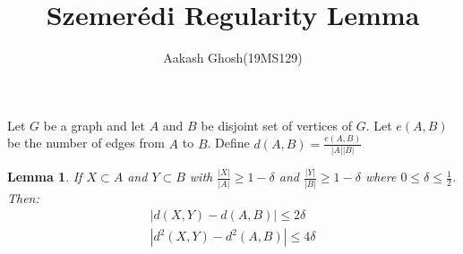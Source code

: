 \documentclass{tufte-handout}
\title{\Huge{Szemerédi Regularity Lemma}}
\author[Aaksh Ghosh]{Aakash Ghosh(19MS129)}
\newtheorem{lemma}[theorem]{Lemma}
\begin{document}
\maketitle%

\begin{abstract}
\noindent
\end{abstract}

\noindent Let $G$ be a graph and let $A$ and $B$ be disjoint set of vertices of $G$. Let $e(A,B)$ be the number of edges from $A$ to $B$. Define $d(A,B)=\frac{e(A,B)}{|A||B|}$  

\begin{lemma}
  If $X\subset A$ and $Y\subset B$ with $\frac{|X|}{|A|}\geq 1-\delta$ and $\frac{|Y|}{|B|}\geq 1-\delta$ where $0\leq \delta\leq\frac{1}{2}$. Then:
  \begin{align}
    |d(X,Y)-d(A,B)|\leq 2\delta\\
    |d^2(X,Y)-d^2(A,B)|\leq 4\delta
  \end{align}  
\end{lemma}




\end{document}
